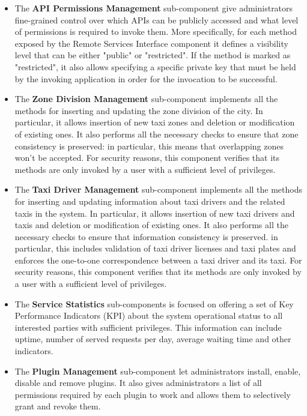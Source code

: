 	\begin{itemize}
		\item The \textbf{API Permissions Management} sub-component give administrators fine-grained control over which APIs can be publicly accessed and what level of permissions is required to invoke them. More specifically, for each method exposed by the Remote Services Interface component it defines a visibility level that can be either "public" or "restricted". If the method is marked as "restricted", it also allows specifying a specific private key that must be held by the invoking application in order for the invocation to be successful. 
		\item The \textbf{Zone Division Management} sub-component implements all the methods for inserting and updating the zone division of the city. In particular, it allows insertion of new taxi zones and deletion or modification of existing ones. It also performs all the necessary checks to ensure that zone consistency is preserved: in particular, this means that overlapping zones won't be accepted. For security reasons, this component verifies that its methods are only invoked by a user with a sufficient level of privileges.
		\item The \textbf{Taxi Driver Management} sub-component implements all the methods for inserting and updating information about taxi drivers and the related taxis in the system. In particular, it allows insertion of new taxi drivers and taxis and deletion or modification of existing ones. It also performs all the necessary checks to ensure that information consistency is preserved. in particular, this includes validation of taxi driver licenses and taxi plates and enforces the one-to-one correspondence between a taxi driver and its taxi. For security reasons, this component verifies that its methods are only invoked by a user with a sufficient level of privileges.
		\item The \textbf{Service Statistics} sub-components is focused on offering a set of Key Performance Indicators (KPI) about the system operational status to all interested parties with sufficient privileges. This information can include uptime, number of served requests per day, average waiting time and other indicators. 
		\item The \textbf{Plugin Management} sub-component let administrators install, enable, disable and remove plugins. It also gives administrators a list of all permissions required by each plugin to work and allows them to selectively grant and revoke them.
	\end{itemize}
	
